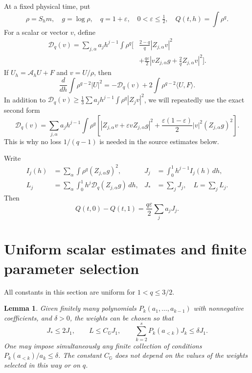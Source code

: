 \documentclass[11pt,a4paper]{amsart}
\numberwithin{equation}{section}
\newtheorem{lemma}[theorem]{Lemma}
\theoremstyle{remark}\newtheorem{remark}[theorem]{Remark}
\newcommand{\G}{\mathbb G}
\newcommand{\eps}{\varepsilon}
\newcommand{\cA}{\mathcal A}
\newcommand{\cD}{\mathcal D}
\newcommand{\ip}[2]{\langle #1,#2\rangle}
\newcommand{\dd}{\,d}
\begin{document}
At a fixed physical time, put
\[
 \rho=S_hm,\quad g=\log\rho,\quad q=1+\eps,\quad 0<\eps\le\tfrac12,
 \quad Q(t,h)=\int\rho^q.
\]
For a scalar or vector $v$, define
\begin{align}
 \cD_q(v)=\sum_{j,\alpha}a_jh^{j-1}\int\rho^q
 \bigg[&\frac{2-q}{q}|Z_{j,\alpha}v|^2\\[-2mm]
 &+\frac{q\eps}{2}\left|vZ_{j,\alpha}g+\frac2q Z_{j,\alpha}v\right|^2
 \bigg].\label{eq:Dq}
\end{align}
If $U_h=\cA_hU+F$ and $v=U/\rho$, then
\begin{equation}\label{eq:entropy-rule}
 \frac d{dh}\int\rho^{q-2}|U|^2
 =-\cD_q(v)+2\int\rho^{q-2}\ip UF.
\end{equation}
In addition to $\cD_q(v)\ge\frac13\sum a_jh^{j-1}\int\rho^q|Z_jv|^2$,
we will repeatedly use the exact second form
\begin{equation}\label{eq:second-square}
 \cD_q(v)=\sum_{j,\alpha}a_jh^{j-1}\int\rho^q
 \left[|Z_{j,\alpha}v+\eps vZ_{j,\alpha}g|^2
 +\frac{\eps(1-\eps)}2|v|^2(Z_{j,\alpha}g)^2\right].
\end{equation}
This is why no loss $1/(q-1)$ is needed in the source estimates below.

Write
\begin{align}
 I_j(h)&=\sum_\alpha\int\rho^q(Z_{j,\alpha}g)^2,&
 J_j&=\int_0^1h^{j-1}I_j(h)\dd h,\label{eq:J}\\
 L_j&=\sum_\alpha\int_0^1h^j\cD_q(Z_{j,\alpha}g)\dd h,&
 J_*&=\sum_jJ_j,\quad L=\sum_jL_j.\label{eq:L}
\end{align}
Then
\begin{equation}\label{eq:Qgap}
 Q(t,0)-Q(t,1)=\frac{q\eps}{2}\sum_ja_jJ_j.
\end{equation}

\section{Uniform scalar estimates and finite parameter selection}
All constants in this section are uniform for $1<q\le3/2$.

\begin{lemma}\label{lem:scalar}
Given finitely many polynomials $P_k(a_1,\ldots,a_{k-1})$ with nonnegative
coefficients, and $\delta>0$, the weights can be chosen so that
\begin{equation}\label{eq:scalar-targets}
 J_*\le2J_1,\qquad L\le C_\G J_1,\qquad
 \sum_{k=2}^sP_k(a_{<k})J_k\le\delta J_1.
\end{equation}
One may impose simultaneously any finite collection of conditions
$P_k(a_{<k})/a_k\le\delta$. The constant $C_\G$ does not depend on the
values of the weights selected in this way or on $q$.
\end{lemma}
\end{document}
